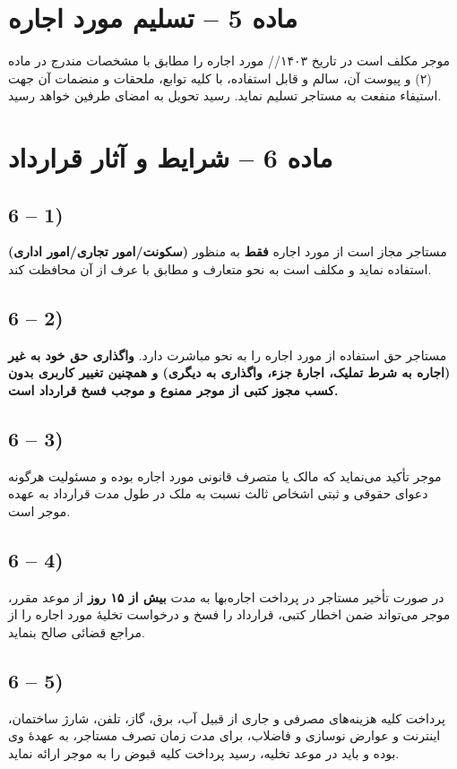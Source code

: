 \documentclass[14pt]{article}
\begin{document}
	\section*{ماده 5 – تسلیم مورد اجاره}
	موجر مکلف است در تاریخ ۱۴۰۳/\underline{\hspace{.5cm}}/\underline{\hspace{.5cm}} مورد اجاره را مطابق با مشخصات مندرج در ماده (۲) و پیوست آن، سالم و قابل استفاده، با کلیه توابع، ملحقات و منضمات آن جهت استیفاء منفعت به مستاجر تسلیم نماید. رسید تحویل به امضای طرفین خواهد رسید.
	
	\section*{ماده 6 – شرایط و آثار قرارداد}
	\subsection*{6 – 1)}
	مستاجر مجاز است از مورد اجاره
	\textbf{فقط} به منظور
	\textbf{(سکونت/امور تجاری/امور اداری)} استفاده نماید و مکلف است به نحو متعارف و مطابق با عرف از آن محافظت کند.
	\subsection*{6 – 2)}
	مستاجر حق استفاده از مورد اجاره را به نحو مباشرت دارد.
	\textbf{واگذاری حق خود به غیر (اجاره به شرط تملیک، اجارهٔ جزء، واگذاری به دیگری) و همچنین تغییر کاربری بدون کسب مجوز کتبی از موجر ممنوع و موجب فسخ قرارداد است.}
	\subsection*{6 – 3)}
	موجر تأکید می‌نماید که مالک یا متصرف قانونی مورد اجاره بوده و مسئولیت هرگونه دعوای حقوقی و ثبتی اشخاص ثالث نسبت به ملک در طول مدت قرارداد به عهده موجر است.
	\subsection*{6 – 4)}
	در صورت تأخیر مستاجر در پرداخت اجاره‌بها به مدت
	\textbf{بیش از ۱۵ روز} از موعد مقرر، موجر می‌تواند ضمن اخطار کتبی، قرارداد را فسخ و درخواست تخلیهٔ مورد اجاره را از مراجع قضائی صالح بنماید.
	\subsection*{6 – 5)}
	پرداخت کلیه هزینه‌های مصرفی و جاری از قبیل آب، برق، گاز، تلفن، شارژ ساختمان، اینترنت و عوارض نوسازی و فاضلاب، برای مدت زمان تصرف مستاجر، به عهدهٔ وی بوده و باید در موعد تخلیه، رسید پرداخت کلیه قبوض را به موجر ارائه نماید.
\end{document}
